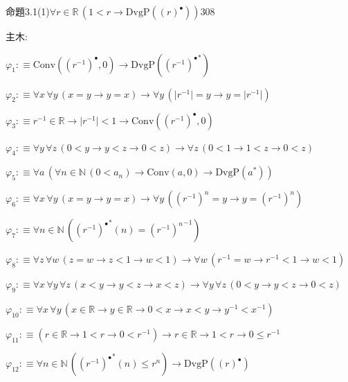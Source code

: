 \begin{fullproof}{命題3.1(1)}{$\forall r \in \mathbb{R}\,(1 < r \to \mathrm{DvgP}({(r)^{\bullet}}))$}{308}
\begin{ptree}
\end{ptree}
\noindent 主木:
\begin{ptree}
\noLine
{}
\noLine
{}
\noLine
{}
\end{ptree}
\begin{abbrevlist}
\item $\varphi_{1} :\equiv \mathrm{Conv}({(r^{-1})^{\bullet}},0) \to \mathrm{DvgP}({(r^{-1})^{\bullet}}^{\ast})$
\item $\varphi_{2} :\equiv \forall x\,\forall y\,(x = y \to y = x) \to \forall y\,(\lvert r^{-1} \rvert = y \to y = \lvert r^{-1} \rvert)$
\item $\varphi_{3} :\equiv r^{-1} \in \mathbb{R} \to \lvert r^{-1} \rvert < 1 \to \mathrm{Conv}({(r^{-1})^{\bullet}},0)$
\item $\varphi_{4} :\equiv \forall y\,\forall z\,(0 < y \to y < z \to 0 < z) \to \forall z\,(0 < 1 \to 1 < z \to 0 < z)$
\item $\varphi_{5} :\equiv \forall a\,(\forall n \in \mathbb{N}\,(0 < a_{n}) \to \mathrm{Conv}(a,0) \to \mathrm{DvgP}(a^{\ast}))$
\item $\varphi_{6} :\equiv \forall x\,\forall y\,(x = y \to y = x) \to \forall y\,({{(r^{-1})}^{n}} = y \to y = {{(r^{-1})}^{n}})$
\item $\varphi_{7} :\equiv \forall n \in \mathbb{N}\,({(r^{-1})^{\bullet}}^{\ast}(n) = {{(r^{-1})}^{n}}^{-1})$
\item $\varphi_{8} :\equiv \forall z\,\forall w\,(z = w \to z < 1 \to w < 1) \to \forall w\,(r^{-1} = w \to r^{-1} < 1 \to w < 1)$
\item $\varphi_{9} :\equiv \forall x\,\forall y\,\forall z\,(x < y \to y < z \to x < z) \to \forall y\,\forall z\,(0 < y \to y < z \to 0 < z)$
\item $\varphi_{10} :\equiv \forall x\,\forall y\,(x \in \mathbb{R} \to y \in \mathbb{R} \to 0 < x \to x < y \to y^{-1} < x^{-1})$
\item $\varphi_{11} :\equiv (r \in \mathbb{R} \to 1 < r \to 0 < r^{-1}) \to r \in \mathbb{R} \to 1 < r \to 0 \leq r^{-1}$
\item $\varphi_{12} :\equiv \forall n \in \mathbb{N}\,({(r^{-1})^{\bullet}}^{\ast}(n) \leq {{r}^{n}}) \to \mathrm{DvgP}({(r)^{\bullet}})$

\end{abbrevlist}
\end{fullproof}
